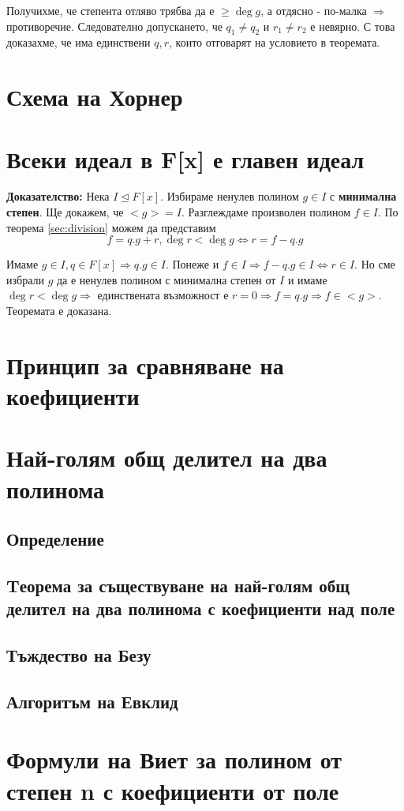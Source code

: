 \documentclass[fleqn,12pt]{article}
\begin{document}
Получихме, че степента отляво трябва да е $\geq \deg g$, а отдясно - по-малка
$\Rightarrow$ противоречие. Следователно допускането, че $q_1 \neq q_2$ и $r_1 \neq r_2$ е невярно.
С това доказахме, че има единствени $q,r$, които отговарят на условието в теоремата.


\section{Схема на Хорнер}

\section{Всеки идеал в F[x] е главен идеал}
\textbf{Доказателство: } Нека $I \trianglelefteq F[x]$. Избираме ненулев полином $g \in I$ с \textbf{минимална степен}.
Ще докажем, че $<g> = I$.
Разглеждаме произволен полином $f \in I$. По теорема \ref{sec:division} можем да представим 
\[ f = q.g + r, \deg r < \deg g \Leftrightarrow r = f - q.g \]

Имаме $g \in I, q \in F[x] \Rightarrow q.g \in I$. Понеже и $f \in I \Rightarrow f - q.g \in I \Leftrightarrow r \in I$.
Но сме избрали $g$ да е ненулев полином с минимална степен от $I$ и имаме $\deg r < \deg g \Rightarrow$ единствената възможност
е $r = 0 \Rightarrow f = q.g \Rightarrow f \in <g>$. Теоремата е доказана.

\section{Принцип за сравняване на коефициенти}

\section{Най-голям общ делител на два полинома}
\subsection{Определение}
\subsection{Tеорема за съществуване на най-голям общ делител на два полинома с коефициенти над поле}
\subsection{Тъждество на Безу}
\subsection{Алгоритъм на Евклид}

\section{Формули на Виет за полином от степен n с коефициенти от поле}
\end{document}

